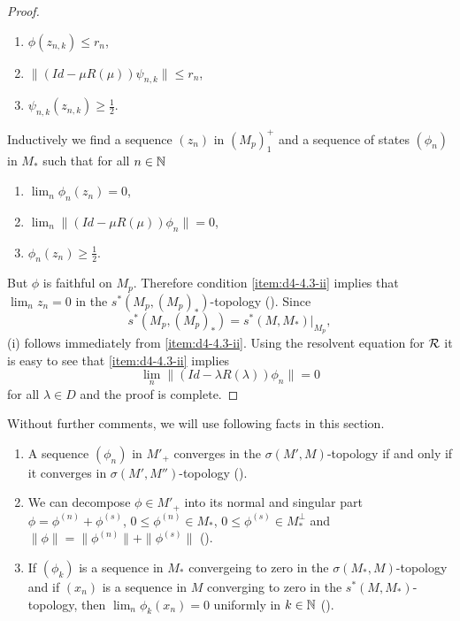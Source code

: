 \begin{proof}
\begin{enumerate}[label=(\roman*$^{\prime}$)]
\item
$ \phi(z_{n,k}) \leq r_{n} $,

\item
$ \|(Id - \mu R(\mu))\psi_{n,k}\| \leq r_{n} $,

\item
$ \psi_{n,k}(z_{n,k}) \geq \frac{1}{2} $. 
\end{enumerate}
Inductively we find a sequence $ (z_{n}) $  in $ (M_{p})_{1}^{+} $  and a sequence of states $ (\phi_{n}) $  in $ M_{*} $  such that for all $ n \in \mathbb{N} $ 
\begin{enumerate}[label=(\roman*$^{\prime\prime}$)]
\item
$ \lim_{n} \phi_{n}(z_{n}) = 0 $, 

\item%
$ \lim_{n} \|(Id - \mu R(\mu))\phi_{n}\| = 0 $, 

\item
$ \phi_{n}(z_{n}) \geq \frac{1}{2} $.
\end{enumerate}
But $ \phi $  is faithful on $ M_{p} $.
Therefore condition \ref{item:d4-4.3-ii} implies that $ \lim_{n} z_{n} = 0 $  in the $ s^{*}(M_{p},(M_{p})_{*}) $-topology (\citet[Proposition III.5.4]{takesaki:1979}).
Since 
%
\[
	s^{*}(M_{p},(M_{p})_{*}) = s^{*}(M,M_{*})|_{M_{p}} ,
\]
%
(i) follows immediately from \ref{item:d4-4.3-ii}.
Using the resolvent equation for $ \mathcal{R} $  it is easy to see that \ref{item:d4-4.3-ii} implies
\[
\lim_{n} \|(Id - \lambda R(\lambda))\phi_{n}\| = 0
\]
for all $ \lambda \in D $  and the proof is complete.
\end{proof}
Without further comments, we will use following facts in this section.
\begin{enumerate}[(1)]
\item
A sequence $ (\phi_{n}) $  in $ M'_{+} $  converges in the $ \sigma(M',M) $-topology if and only if it converges in $ \sigma(M',M'') $-topology (\citet{akemann:1972}).

\item
We can decompose $ \phi \in M'_{+} $  into its normal and singular part $ \phi = \phi^{(n)} + \phi^{(s)} $, $ 0 \leq \phi^{(n)} \in M_{*} $, $ 0 \leq \phi^{(s)} \in M_*^{\perp} $  and $ \|\phi\| = \|\phi^{(n)}\| + \|\phi^{(s)}\| $  (\citet[Theorem III.2.14]{takesaki:1979}).

\item
If $ (\phi_{k}) $  is a sequence in $ M_{*} $  convergeing to zero in the $ \sigma(M_{*},M) $-topology and if $ (x_{n}) $  is a sequence in $ M $  converging to zero in the $ s^{*}(M,M_{*}) $-topology, then $ \lim_{n} \phi_{k}(x_{n}) = 0 $  uniformly in $ k \in \mathbb{N} $  (\citet[Lemma III.5.5]{takesaki:1979}).
\end{enumerate}
